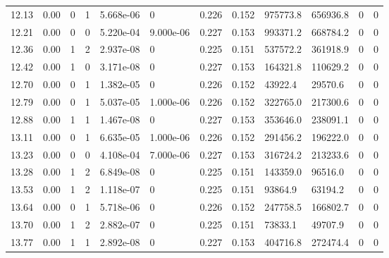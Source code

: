 \documentclass[preview]{standalone}
\begin{document}
{{{\begin{tabular}{L{1.2cm}C{1.2cm} C{0.3cm}C{0.5cm} C{1.4cm}C{1.4cm} C{1.4cm}C{1.4cm} C{1.6cm}C{1.6cm} C{1.6cm}C{1.6cm}}
  12.13  &  0.00  & 0     &  1 &  5.668e-06  & 0  &  0.226&   0.152& 975773.8 & 656936.8   &  0 & 0  \\ 
  12.21  &  0.00  & 0     &  0 &  5.220e-04  & 9.000e-06  &  0.227&   0.153& 993371.2 & 668784.2   &  0 & 0  \\ 
  12.36  &  0.00  & 1     &  2 &  2.937e-08  & 0  &  0.225&   0.151& 537572.2 & 361918.9   &  0 & 0  \\ 
  12.42  &  0.00  & 1     &  0 &  3.171e-08  & 0  &  0.227&   0.153& 164321.8 & 110629.2   &  0 & 0  \\ 
  12.70  &  0.00  & 0     &  1 &  1.382e-05  & 0  &  0.226&   0.152& 43922.4 & 29570.6   &  0 & 0  \\ 
  12.79  &  0.00  & 0     &  1 &  5.037e-05  & 1.000e-06  &  0.226&   0.152& 322765.0 & 217300.6   &  0 & 0  \\ 
  12.88  &  0.00  & 1     &  1 &  1.467e-08  & 0  &  0.227&   0.153& 353646.0 & 238091.1   &  0 & 0  \\ 
  13.11  &  0.00  & 0     &  1 &  6.635e-05  & 1.000e-06  &  0.226&   0.152& 291456.2 & 196222.0   &  0 & 0  \\ 
  13.23  &  0.00  & 0     &  0 &  4.108e-04  & 7.000e-06  &  0.227&   0.153& 316724.2 & 213233.6   &  0 & 0  \\ 
  13.28  &  0.00  & 1     &  2 &  6.849e-08  & 0  &  0.225&   0.151& 143359.0 & 96516.0   &  0 & 0  \\ 
  13.53  &  0.00  & 1     &  2 &  1.118e-07  & 0  &  0.225&   0.151& 93864.9 & 63194.2   &  0 & 0  \\ 
  13.64  &  0.00  & 0     &  1 &  5.718e-06  & 0  &  0.226&   0.152& 247758.5 & 166802.7   &  0 & 0  \\ 
  13.70  &  0.00  & 1     &  2 &  2.882e-07  & 0  &  0.225&   0.151& 73833.1 & 49707.9   &  0 & 0  \\ 
  13.77  &  0.00  & 1     &  1 &  2.892e-08  & 0  &  0.227&   0.153& 404716.8 & 272474.4   &  0 & 0  \\ 
\hline 
\end{tabular} 

}}}
\end{document}
